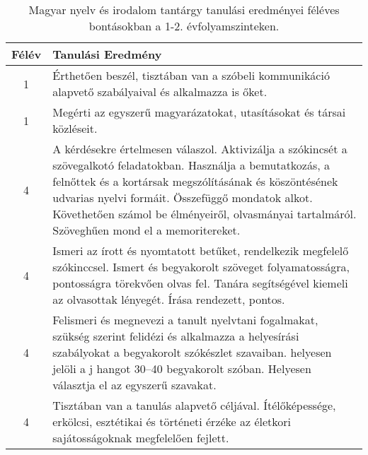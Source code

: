        
           \begin{longtable}{c | p{12cm} }
            \caption[Magyar nyelv és irodalom 1-2.]{Magyar nyelv és irodalom tantárgy tanulási eredményei féléves bontásokban a 1-2. évfolyamszinteken. }  \\

            \textbf{Félév} & \textbf{Tanulási Eredmény} \\
            \hline
            \endhead
                                
                                      
                                
                                          1 &  Érthetően beszél, tisztában van a szóbeli kommunikáció alapvető szabályaival és alkalmazza is őket. \\ \hline
                                          1 &  Megérti az egyszerű magyarázatokat, utasításokat és társai közléseit. \\ \hline
                                      
                                
                                      
                                
                                      
                                
                                          4 &  A kérdésekre értelmesen válaszol. Aktivizálja a szókincsét a szövegalkotó feladatokban. Használja a bemutatkozás, a felnőttek és a kortársak megszólításának és köszöntésének udvarias nyelvi formáit. Összefüggő mondatok alkot. Követhetően számol be élményeiről, olvasmányai tartalmáról. Szöveghűen mond el a memoritereket. \\ \hline
                                          4 &  Ismeri az írott és nyomtatott betűket, rendelkezik megfelelő szókinccsel. Ismert és begyakorolt szöveget folyamatosságra, pontosságra törekvően olvas fel. Tanára segítségével kiemeli az olvasottak lényegét. Írása rendezett, pontos. \\ \hline
                                          4 &  Felismeri és megnevezi a tanult nyelvtani fogalmakat, szükség szerint felidézi és alkalmazza a helyesírási szabályokat a begyakorolt szókészlet szavaiban. helyesen jelöli a j hangot 30–40 begyakorolt szóban. Helyesen választja el az egyszerű szavakat. \\ \hline
                                          4 &  Tisztában van a tanulás alapvető céljával. Ítélőképessége, erkölcsi, esztétikai és történeti érzéke az életkori sajátosságoknak megfelelően fejlett. \\ \hline
                                      
                        \end{longtable}
            \clearpage

